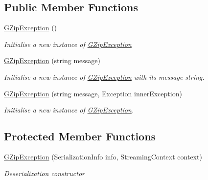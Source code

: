 \subsection*{Public Member Functions}
\begin{DoxyCompactItemize}
\item 
\hyperlink{class_i_c_sharp_code_1_1_sharp_zip_lib_1_1_g_zip_1_1_g_zip_exception_a2bd3a993794359c8e3b0491ef352f3fe}{G\+Zip\+Exception} ()
\begin{DoxyCompactList}\small\item\em Initialise a new instance of \hyperlink{class_i_c_sharp_code_1_1_sharp_zip_lib_1_1_g_zip_1_1_g_zip_exception}{G\+Zip\+Exception} \end{DoxyCompactList}\item 
\hyperlink{class_i_c_sharp_code_1_1_sharp_zip_lib_1_1_g_zip_1_1_g_zip_exception_aa20eec996c784b3dcd1e0f1f2777f467}{G\+Zip\+Exception} (string message)
\begin{DoxyCompactList}\small\item\em Initialise a new instance of \hyperlink{class_i_c_sharp_code_1_1_sharp_zip_lib_1_1_g_zip_1_1_g_zip_exception}{G\+Zip\+Exception} with its message string. \end{DoxyCompactList}\item 
\hyperlink{class_i_c_sharp_code_1_1_sharp_zip_lib_1_1_g_zip_1_1_g_zip_exception_a879e31a800a3d7591a6b94bcaa0d3df0}{G\+Zip\+Exception} (string message, Exception inner\+Exception)
\begin{DoxyCompactList}\small\item\em Initialise a new instance of \hyperlink{class_i_c_sharp_code_1_1_sharp_zip_lib_1_1_g_zip_1_1_g_zip_exception}{G\+Zip\+Exception}. \end{DoxyCompactList}\end{DoxyCompactItemize}
\subsection*{Protected Member Functions}
\begin{DoxyCompactItemize}
\item 
\hyperlink{class_i_c_sharp_code_1_1_sharp_zip_lib_1_1_g_zip_1_1_g_zip_exception_af597988e12ecb457888c676056cad36d}{G\+Zip\+Exception} (Serialization\+Info info, Streaming\+Context context)
\begin{DoxyCompactList}\small\item\em Deserialization constructor \end{DoxyCompactList}\end{DoxyCompactItemize}


